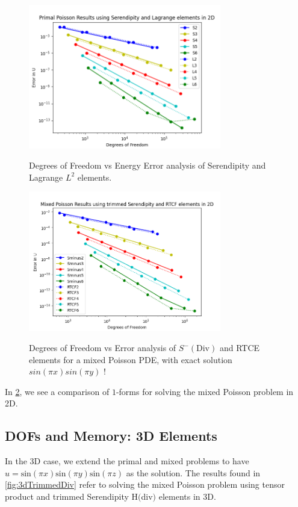 \documentclass[manuscript,screen]{acmart}
\begin{document}
\begin{figure}[h!]
  \caption{Degrees of Freedom vs Energy Error analysis of Serendipity and Lagrange $L^2$ elements.}
  \includegraphics[width=0.75\textwidth]{2dPrimalPoisson.png}
  \label{fig:2dPrimalPoisson}
\end{figure}

\begin{figure}[h!]
  \caption{Degrees of Freedom vs Error analysis of $S^-(\text{Div})$ and RTCE elements for a mixed Poisson PDE, with exact solution $sin(\pi x)sin(\pi y)$ !}
  \includegraphics[width=0.75\textwidth]{MixedPoisson-2d-SminusDiv_RTCF.png}
  \label{fig:2dMixedPoisson}
\end{figure}

In \ref{fig:2dMixedPoisson}, we see a comparison of $1$-forms for solving the mixed Poisson problem in 2D.  

\subsection{DOFs and Memory: 3D Elements}

In the 3D case, we extend the primal and mixed problems to have $u = \text{sin}(\pi x)\text{sin}(\pi y)\text{sin}(\pi z)$ as the solution.  The results found in \ref{fig:3dTrimmedDiv} refer to solving the mixed Poisson problem using tensor product and trimmed Serendipity H$($div$)$ elements in 3D.
\end{document}

